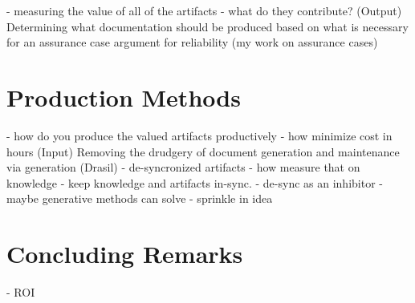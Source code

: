 \documentclass[sigconf, authorversion, nonacm]{acmart}
\begin{document}
- measuring the value of all of the artifacts - what do they contribute? (Output)
Determining what documentation should be produced based on what is necessary for
an assurance case argument for reliability (my work on assurance cases) 

\section{Production Methods}

- how do you produce the valued artifacts productively - how minimize cost in
hours (Input) Removing the drudgery of document generation and maintenance via
generation (Drasil) - de-syncronized artifacts - how measure that on knowledge -
keep knowledge and artifacts in-sync.
- de-sync as an inhibitor - maybe generative methods can solve
- sprinkle in idea

\section{Concluding Remarks}

- ROI



\end{document}
